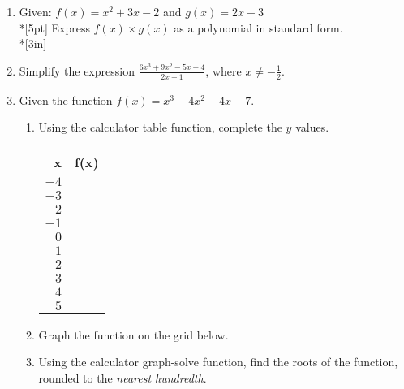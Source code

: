 \documentclass[12pt, oneside]{article}
\begin{document}
\begin{enumerate}
\newpage

\item Given: $f(x)=x^2+ 3x - 2$ and $g(x)=2x+3$\\*[5pt]
Express $f(x) \times g(x)$ as a polynomial in standard form. \\*[3in]


\item Simplify the expression $\displaystyle \frac{6x^3+9x^2-5x-4}{2x+1}$, where $x \neq -\frac{1}{2}$. 

\newpage

\item Given the function $f(x)=x^3-4x^2-4x-7$. 
\begin{enumerate}
    \item Using the calculator table function, complete the $y$ values.
    \begin{tabular}{r|r}
    x & f(x)\\ 
    \hline 
    $-4$ & \\[5pt]
    $-3$ & \\[5pt]
    $-2$ & \\[5pt]
    $-1$ & \\[5pt]
    $0$ & \\[5pt]
    $1$ & \\[5pt]
    $2$ & \\[5pt]
    $3$ & \\[5pt]
    $4$ & \\[5pt]
    $5$ & \\ 
    \end{tabular}
    \item Graph the function on the grid below.
    \item Using the calculator graph-solve function, find the roots of the function, rounded to the \emph{nearest hundredth}.
\end{enumerate}
\begin{center}
\end{center}


\end{enumerate}
\end{document}
